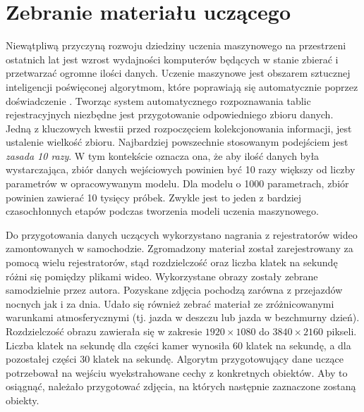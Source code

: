 %



\chapter{Zebranie materiału uczącego}\label{ch:preparing_data_set}

Niewątpliwą przyczyną rozwoju dziedziny uczenia maszynowego na przestrzeni ostatnich lat jest wzrost wydajności komputerów będących w stanie zbierać i przetwarzać ogromne ilości danych.
Uczenie maszynowe jest obszarem sztucznej inteligencji poświęconej algorytmom, które poprawiają się automatycznie poprzez doświadczenie \cite{Mitchell97}.
Tworząc system automatycznego rozpoznawania tablic rejestracyjnych niezbędne jest przygotowanie odpowiedniego zbioru danych.
Jedną z kluczowych kwestii przed rozpoczęciem kolekcjonowania informacji, jest ustalenie wielkość zbioru.
Najbardziej powszechnie stosowanym podejściem jest \emph{zasada 10 razy}.
W tym kontekście oznacza ona, że aby ilość danych była wystarczająca, zbiór danych wejściowych powinien być 10 razy większy od liczby parametrów w opracowywanym modelu.
Dla modelu o 1000 parametrach, zbiór powinien zawierać 10 tysięcy próbek.
Zwykle jest to jeden z bardziej czasochłonnych etapów podczas tworzenia modeli uczenia maszynowego.

Do przygotowania danych uczących wykorzystano nagrania z rejestratorów wideo zamontowanych w samochodzie.
Zgromadzony materiał został zarejestrowany za pomocą wielu rejestratorów, stąd rozdzielczość oraz liczba klatek na sekundę różni się pomiędzy plikami wideo.
Wykorzystane obrazy zostały zebrane samodzielnie przez autora.
Pozyskane zdjęcia pochodzą zarówna z przejazdów nocnych jak i za dnia.
Udało się również zebrać materiał ze zróżnicowanymi warunkami atmosferycznymi (tj. jazda w deszczu lub jazda w bezchmurny dzień).
Rozdzielczość obrazu zawierała się w zakresie $1920\times 1080$ do $3840\times 2160$ pikseli.
Liczba klatek na sekundę dla części kamer wynosiła 60 klatek na sekundę, a dla pozostałej części 30 klatek na sekundę.
Algorytm przygotowujący dane uczące potrzebował na wejściu wyekstrahowane cechy z konkretnych obiektów.
Aby to osiągnąć, należało przygotować zdjęcia, na których następnie zaznaczone zostaną obiekty.

